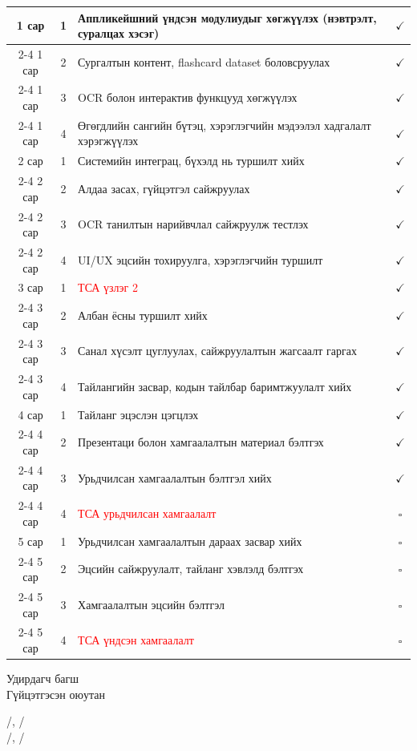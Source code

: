\begin{table}[H]
\begin{tabular}{|c|c|l|c|}
1 сар & 1 & Аппликейшний үндсэн модулиудыг хөгжүүлэх (нэвтрэлт, суралцах хэсэг) & $\checkmark$ \\
\cline{2-4}
1 сар & 2 & Сургалтын контент, flashcard dataset боловсруулах & $\checkmark$ \\
\cline{2-4}
1 сар & 3 & OCR болон интерактив функцууд хөгжүүлэх & $\checkmark$ \\
\cline{2-4}
1 сар & 4 & Өгөгдлийн сангийн бүтэц, хэрэглэгчийн мэдээлэл хадгалалт хэрэгжүүлэх & $\checkmark$ \\
\hline

2 сар & 1 & Системийн интеграц, бүхэлд нь туршилт хийх & $\checkmark$ \\
\cline{2-4}
2 сар & 2 & Алдаа засах, гүйцэтгэл сайжруулах & $\checkmark$ \\
\cline{2-4}
2 сар & 3 & OCR танилтын нарийвчлал сайжруулж тестлэх & $\checkmark$ \\
\cline{2-4}
2 сар & 4 & UI/UX эцсийн тохируулга, хэрэглэгчийн туршилт & $\checkmark$ \\
\hline

3 сар & 1 & \textcolor{red}{ТСА үзлэг 2} & $\checkmark$ \\
\cline{2-4}
3 сар & 2 & Албан ёсны туршилт хийх & $\checkmark$ \\
\cline{2-4}
3 сар & 3 & Санал хүсэлт цуглуулах, сайжруулалтын жагсаалт гаргах & $\checkmark$ \\
\cline{2-4}
3 сар & 4 & Тайлангийн засвар, кодын тайлбар баримтжуулалт хийх & $\checkmark$ \\
\hline

4 сар & 1 & Тайланг эцэслэн цэгцлэх & $\checkmark$ \\
\cline{2-4}
4 сар & 2 & Презентаци болон хамгаалалтын материал бэлтгэх & $\checkmark$ \\
\cline{2-4}
4 сар & 3 & Урьдчилсан хамгаалалтын бэлтгэл хийх & $\checkmark$ \\
\cline{2-4}
4 сар & 4 & \textcolor{red}{ТСА урьдчилсан хамгаалалт} & $\square$ \\
\hline

5 сар & 1 & Урьдчилсан хамгаалалтын дараах засвар хийх & $\square$ \\
\cline{2-4}
5 сар & 2 & Эцсийн сайжруулалт, тайланг хэвлэлд бэлтгэх & $\square$ \\
\cline{2-4}
5 сар & 3 & Хамгаалалтын эцсийн бэлтгэл & $\square$ \\
\cline{2-4}
5 сар & 4 & \textcolor{red}{ТСА үндсэн хамгаалалт} & $\square$ \\
\hline

\end{tabular}
\end{table}

\vspace{6mm}
\noindent\begin{minipage}{0.4\textwidth}
Удирдагч багш\\
Гүйцэтгэсэн оюутан
\end{minipage}
\hfill
\begin{minipage}{0.55\textwidth}
\raggedleft
/\supervisor, \supervisortitle/\\
/\authorcode, \authorshort/\\
\end{minipage}
\noindent